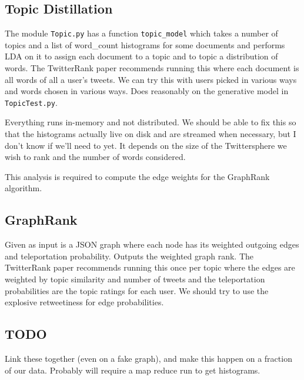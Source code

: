 

\subsection*{Topic Distillation}

The module \texttt{Topic.py} has a function \texttt{topic_model} which takes a number of topics and a list of word_count histograms for some documents and performs LDA on it to assign each document to a topic and to topic a distribution of words.
The TwitterRank paper recommends running this where each document is all words of all a user's tweets.  
We can try this with users picked in various ways and words chosen in various ways.  
Does reasonably on the generative model in \texttt{TopicTest.py}.

Everything runs in-memory and not distributed.
We should be able to fix this so that the histograms actually live on disk and are streamed when necessary, but I don't know if we'll need to yet.  It depends on the size of the Twittersphere we wish to rank and the number of words considered.  

This analysis is required to compute the edge weights for the GraphRank algorithm.  


\subsection*{GraphRank}

Given as input is a JSON graph where each node has its weighted outgoing edges and teleportation probability.
Outputs the weighted graph rank.  
The TwitterRank paper recommends running this once per topic where the edges are weighted by topic similarity and number of tweets and the teleportation probabilities are the topic ratings for each user.  
We should try to use the explosive retweetiness for edge probabilities.  

\subsection*{TODO}

Link these together (even on a fake graph), and make this happen on a fraction of our data.
Probably will require a map reduce run to get histograms.  
